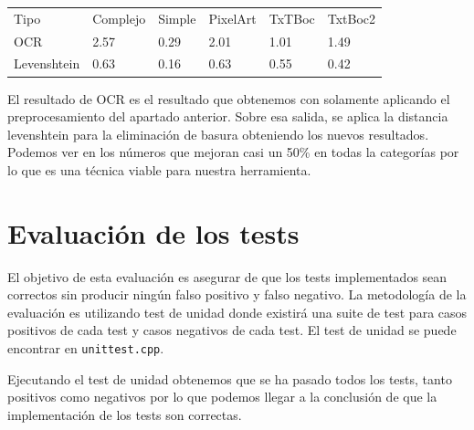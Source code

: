 \begin{table}[H]
\begin{tabular}{llllll}
Tipo        & Complejo & Simple & PixelArt & TxTBoc & TxtBoc2                      \\
OCR         & 2.57     & 0.29   & 2.01     & 1.01   & \cellcolor[HTML]{FFFFFF}1.49 \\
Levenshtein & 0.63     & 0.16   & 0.63     & 0.55   & 0.42                        
\end{tabular}
\end{table}
El resultado de OCR es el resultado que obtenemos con solamente aplicando el preprocesamiento del apartado anterior. Sobre esa salida, se aplica la distancia levenshtein para la eliminación de basura obteniendo los nuevos resultados. Podemos ver en los números que mejoran casi un 50\% en todas la categorías por lo que es una técnica viable para nuestra herramienta.
\section{Evaluación de los tests}
El objetivo de esta evaluación es asegurar de que los tests implementados sean correctos sin producir ningún falso positivo y falso negativo.
La metodología de la evaluación es utilizando test de unidad donde existirá una suite de test para casos positivos de cada test y casos negativos de cada test. El test de unidad se puede encontrar en \texttt{unittest.cpp}.

Ejecutando el test de unidad obtenemos que se ha pasado todos los tests, tanto positivos como negativos por lo que podemos llegar a la conclusión de que la implementación de los tests son correctas.

